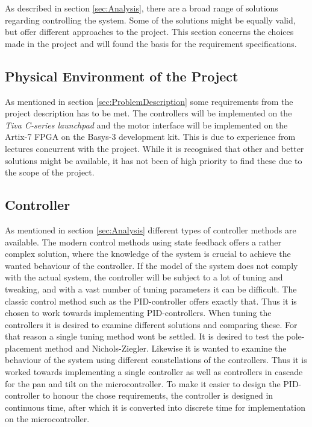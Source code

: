 \documentclass[../../main.tex]{subfiles}
\begin{document}
As described in section \ref{sec:Analysis}, there are a broad range of solutions regarding controlling the system. Some of the solutions might be equally valid, but offer different approaches to the project. This section concerns the choices made in the project and will found the basis for the requirement specifications.

\subsection*{Physical Environment of the Project}
As mentioned in section \ref{sec:ProblemDescription} some requirements from the project description has to be met. The controllers will be implemented on the \textit{Tiva C-series launchpad} and the motor interface will be implemented on the Artix-7 FPGA on the Basys-3 development kit. This is due to experience from lectures concurrent with the project. While it is recognised that other and better solutions might be available, it has not been of high priority to find these due to the scope of the project. 



\subsection*{Controller}
As mentioned in section \ref{sec:Analysis} different types of controller methods are available. The modern control methods using state feedback offers a rather complex solution, where the knowledge of the system is crucial to achieve the wanted behaviour of the controller. If the model of the system does not comply with the actual system, the controller will be subject to a lot of tuning and tweaking, and with a vast number of tuning parameters it can be difficult. The classic control method such as the PID-controller offers exactly that. Thus it is chosen to work towards implementing PID-controllers. When tuning the controllers it is desired to examine different solutions and comparing these. For that reason a single tuning method wont be settled. It is desired to test the pole-placement method and Nichols-Ziegler. Likewise it is wanted to examine the behaviour of the system using different constellations of the controllers. Thus it is worked towards implementing a single controller as well as controllers in cascade for the pan and tilt on the microcontroller. To make it easier to design the PID-controller to honour the chose requirements, the controller is designed in continuous time, after which it is converted into discrete time for implementation on the microcontroller. 
\end{document}
